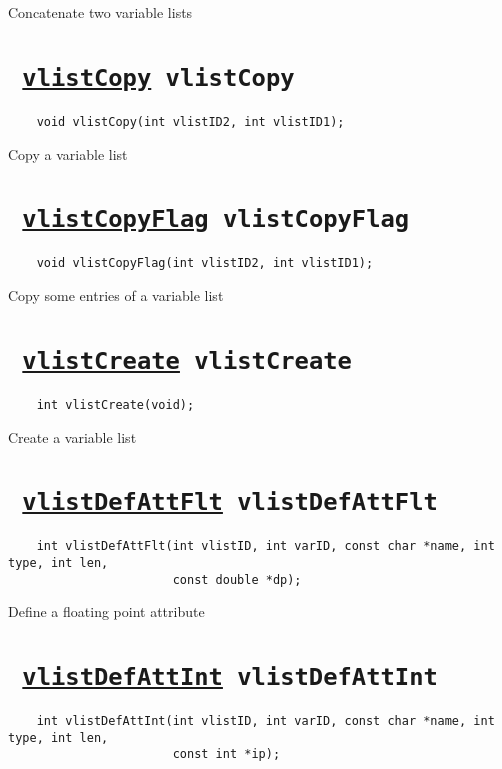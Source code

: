 Concatenate two variable lists
\ifpdfoutput{}{(\ref{vlistCat})}


\section*{\tt 
\ifpdf
\hyperref[vlistCopy]{vlistCopy}
\else
vlistCopy
\fi
}
\begin{verbatim}
    void vlistCopy(int vlistID2, int vlistID1);
\end{verbatim}

Copy a variable list
\ifpdfoutput{}{(\ref{vlistCopy})}


\section*{\tt 
\ifpdf
\hyperref[vlistCopyFlag]{vlistCopyFlag}
\else
vlistCopyFlag
\fi
}
\begin{verbatim}
    void vlistCopyFlag(int vlistID2, int vlistID1);
\end{verbatim}

Copy some entries of a variable list
\ifpdfoutput{}{(\ref{vlistCopyFlag})}


\section*{\tt 
\ifpdf
\hyperref[vlistCreate]{vlistCreate}
\else
vlistCreate
\fi
}
\begin{verbatim}
    int vlistCreate(void);
\end{verbatim}

Create a variable list
\ifpdfoutput{}{(\ref{vlistCreate})}


\section*{\tt 
\ifpdf
\hyperref[vlistDefAttFlt]{vlistDefAttFlt}
\else
vlistDefAttFlt
\fi
}
\begin{verbatim}
    int vlistDefAttFlt(int vlistID, int varID, const char *name, int type, int len, 
                       const double *dp);
\end{verbatim}

Define a floating point attribute
\ifpdfoutput{}{(\ref{vlistDefAttFlt})}


\section*{\tt 
\ifpdf
\hyperref[vlistDefAttInt]{vlistDefAttInt}
\else
vlistDefAttInt
\fi
}
\begin{verbatim}
    int vlistDefAttInt(int vlistID, int varID, const char *name, int type, int len, 
                       const int *ip);
\end{verbatim}

